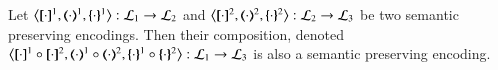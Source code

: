 \smallskip 

\begin{proposition}
	Let 
	$\enco{\map{\cdot}^{1}, \mapt{\cdot}^{1}, \mapa{\cdot}^{1}}: \tyl{L}_1 \to \tyl{L}_2$
	and 
	$\enco{\map{\cdot}^{2}, \mapt{\cdot}^{2}, \mapa{\cdot}^{2}}: \tyl{L}_2 \to \tyl{L}_3$
	be two semantic preserving encodings.
	Then their composition, denoted 
	$\enco{\map{\cdot}^{1} \circ \map{\cdot}^{2}, \mapt{\cdot}^{1} \circ \mapt{\cdot}^{2}, \mapa{\cdot}^{1}\circ \mapa{\cdot}^{2}}: \tyl{L}_1 \to \tyl{L}_3$
	is also a semantic preserving encoding.
\end{proposition}


